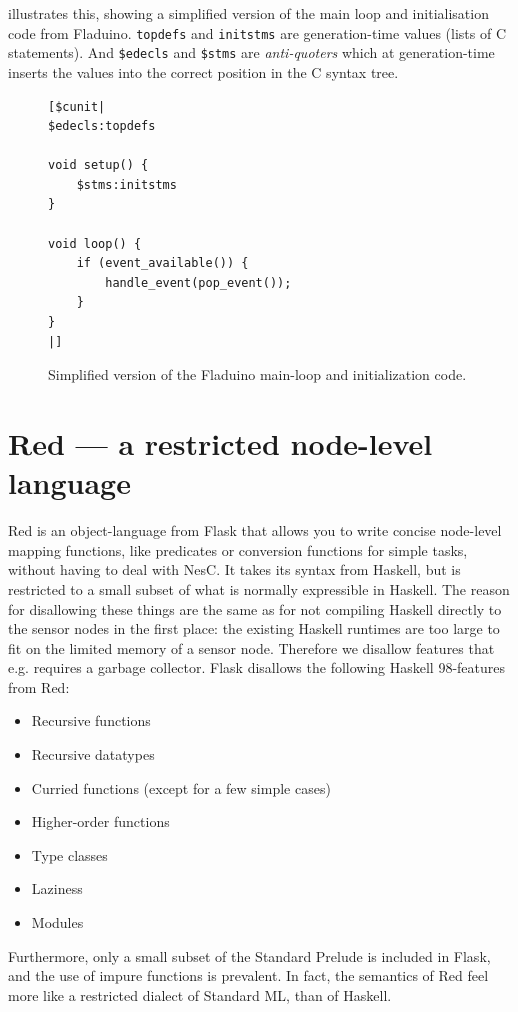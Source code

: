 \documentclass[a4paper, oneside, final]{memoir}
\let\Fref\undefined
\begin{document}
\Fref{fig:mainloop} illustrates this, showing a simplified
version of the main loop and initialisation code from Fladuino.
\texttt{topdefs} and \texttt{initstms} are generation-time values
(lists of C statements). And \texttt{\$edecls} and \texttt{\$stms} are
\textit{anti-quoters} which at generation-time inserts the values into
the correct position in the C syntax tree.

\begin{figure}
\begin{verbatim}
[$cunit|
$edecls:topdefs

void setup() {
    $stms:initstms
}

void loop() {
    if (event_available()) {
        handle_event(pop_event());
    }
}
|]
\end{verbatim}
\caption{Simplified version of the Fladuino main-loop and
  initialization code.}
\label{fig:mainloop}
\end{figure}

\section{Red --- a restricted node-level language}
\label{sec:red}
Red is an object-language from Flask that allows you to write concise
node-level mapping functions, like predicates or conversion functions
for simple tasks, without having to deal with NesC. It takes its
syntax from Haskell, but is restricted to a small subset of what is
normally expressible in Haskell. The reason for disallowing these
things are the same as for not compiling Haskell directly to the
sensor nodes in the first place: the existing Haskell runtimes are too
large to fit on the limited memory of a sensor node. Therefore we
disallow features that e.g.  requires a garbage collector. Flask
disallows the following Haskell 98-features from Red:
\begin{itemize}
\item Recursive functions
\item Recursive datatypes
\item Curried functions (except for a few simple cases)
\item Higher-order functions
\item Type classes
\item Laziness
\item Modules
\end{itemize}

Furthermore, only a small subset of the Standard Prelude is included
in Flask, and the use of impure functions is prevalent.  In fact, the
semantics of Red feel more like a restricted dialect of Standard ML,
than of Haskell.
\end{document}
